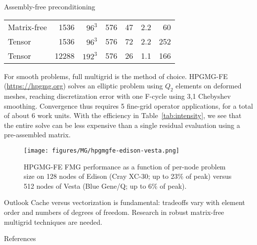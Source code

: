 \documentclass[final,t]{beamer}
\begin{document}
\begin{frame}{}
\begin{columns}
\begin{column}{0.48\textwidth}
\begin{block}{Assembly-free preconditioning}
\begin{table}
\begin{tabular}{l rrr rr r}
            Matrix-free & 1536 & $96^3$ & 576  & 47  & 2.2 & 60  \\
            Tensor      & 1536 & $96^3$ & 576  & 72  & 2.2 & 252 \\
            
            Tensor      & 12288 & $192^3$ & 576  & 26 & 1.1 & 166 \\
            \bottomrule
          \end{tabular}
        \end{table}
        For smooth problems, full multigrid is the method of choice.
        HPGMG-FE (\url{https://hpgmg.org}) solves an elliptic problem using $Q_2$ elements on deformed meshes, reaching discretization error with one F-cycle using 3,1 Chebyshev smoothing.
        Convergence thus requires 5 fine-grid operator applications, for a total of about 6 work units.
        With the efficiency in Table~\ref{tab:intensity}, we see that the entire solve can be less expensive than a single residual evaluation using a pre-assembled matrix.
        \begin{figure}
          \centering
          \texttt{[image: figures/MG/hpgmgfe-edison-vesta.png]}
          \caption{HPGMG-FE FMG performance as a function of per-node problem size on 128 nodes of Edison (Cray XC-30; up to 23\% of peak) versus 512 nodes of Vesta (Blue Gene/Q; up to 6\% of peak).}\label{fig:hpgmg}
        \end{figure}
      \end{block}
      \vspace{-2em}
      \begin{block}{Outlook}
        Cache versus vectorization is fundamental: tradeoffs vary with element order and numbers of degrees of freedom.
        Research in robust matrix-free multigrid techniques are needed.
      \end{block}
      \vspace{-2em}
      \begin{block}{References}
        \scriptsize
        \begin{minipage}{\textwidth}
          \begin{multicols}{2}
            
          \end{multicols}
        \end{minipage}
      \end{block}
    \end{column}
  \end{columns}
\end{frame}
\end{document}
